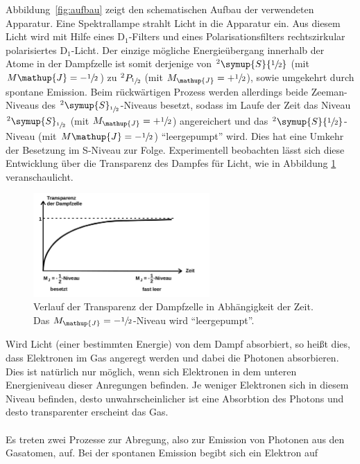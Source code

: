 \documentclass[
  bibliography=totoc,     %
  captions=tableheading,  %
  titlepage=firstiscover, %
]{scrartcl}
\begin{document}
\noindent
Abbildung~\ref{fig:aufbau} zeigt den schematischen Aufbau der verwendeten
Apparatur. Eine Spektrallampe strahlt Licht in die Apparatur ein. Aus diesem
Licht wird mit Hilfe eines $\text{D}_1$-Filters und eines Polarisationsfilters
rechtszirkular polarisiertes $\text{D}_1$-Licht. Der einzige mögliche
Energieübergang innerhalb der Atome in der Dampfzelle ist somit derjenige von
$^2\symup{S}{\sfrac{1}{2}}$ (mit $M{\mathup{J}}=-\sfrac{1}{2}$) zu
$^2P_{\sfrac{1}{2}}$ (mit $M_{\mathup{J}}=+\sfrac{1}{2}$), sowie umgekehrt durch
spontane Emission. Beim rückwärtigen Prozess werden allerdings beide
Zeeman-Niveaus des $^2\symup{S}_{\sfrac{1}{2}}$-Niveaus besetzt, sodass im
Laufe der Zeit das Niveau $^2\symup{S}_{\sfrac{1}{2}}$ (mit
$M_{\mathup{J}}=+\sfrac{1}{2}$) angereichert und das
$^2\symup{S}{\sfrac{1}{2}}$-Niveau (mit $M{\mathup{J}}=-\sfrac{1}{2}$)
\enquote{leergepumpt} wird. Dies hat eine Umkehr der Besetzung im S-Niveau zur
Folge. Experimentell beobachten lässt sich diese Entwicklung über die
Transparenz des Dampfes für Licht, wie in Abbildung \ref{fig:transparenz} veranschaulicht.
%
\begin{figure}[htb]
  \centering
  \includegraphics[width=0.6\textwidth]{transparenz.pdf}
  \caption{Verlauf der Transparenz der Dampfzelle in Abhängigkeit der Zeit. Das $M_{\mathup{J}}=-\sfrac{1}{2}$-Niveau wird \enquote{leergepumpt}\cite{anleitung}.}
  \label{fig:transparenz}
\end{figure}
\noindent
Wird Licht (einer bestimmten Energie) von dem Dampf absorbiert, so heißt dies,
dass Elektronen im Gas angeregt werden und dabei die Photonen absorbieren. Dies
ist natürlich nur möglich, wenn sich Elektronen in dem unteren Energieniveau
dieser Anregungen befinden. Je weniger Elektronen sich in diesem Niveau
befinden, desto unwahrscheinlicher ist eine Absorbtion des Photons und desto
transparenter erscheint das Gas. \\
\\
Es treten zwei Prozesse zur Abregung, also zur Emission von Photonen aus den
Gasatomen, auf. Bei der spontanen Emission begibt sich ein Elektron auf
\end{document}
